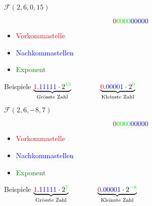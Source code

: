 \ifnum\conditionmacro=1 \documentclass[handout,usenames,dvipsnames]{beamer}\fi
\begin{document}
\begin{frame}{$\mathcal{F}(2,6,0,15)$}
\begin{Huge}
\[{\color{red}{0}}{\color{green}{0000}}{\color{blue}{00000}}\]
\end{Huge}
\begin{itemize}
\item\textcolor{red}{Vorkommastelle}
\item\textcolor{blue}{Nachkommastellen}
\item\textcolor{green}{Exponent}
\end{itemize}
\begin{block}{Beispiele}
$\underbrace{\textcolor{red}{1}.\textcolor{blue}{11111}\cdot 2^{\textcolor{green}{15}}}_\text{Grösste Zahl}\qquad\qquad\underbrace{\textcolor{red}{0}.\textcolor{blue}{00001}\cdot 2^{\textcolor{green}{0}}}_\text{Kleinste Zahl}$
\end{block}
\end{frame}


\begin{frame}{$\mathcal{F}(2,6,-8,7)$}
\begin{Huge}
\[{\color{red}{0}}{\color{green}{0000}}{\color{blue}{00000}}\]
\end{Huge}
\begin{itemize}
\item\textcolor{red}{Vorkommastelle}
\item\textcolor{blue}{Nachkommastellen}
\item\textcolor{green}{Exponent}
\end{itemize}
\begin{block}{Beispiele}
$\underbrace{\textcolor{red}{1}.\textcolor{blue}{11111}\cdot 2^{\textcolor{green}{7}}}_\text{Grösste Zahl}\qquad\qquad\underbrace{\textcolor{red}{0}.\textcolor{blue}{00001}\cdot 2^{\textcolor{green}{-8}}}_\text{Kleinste Zahl}$
\end{block}
\end{frame}

\end{document}
